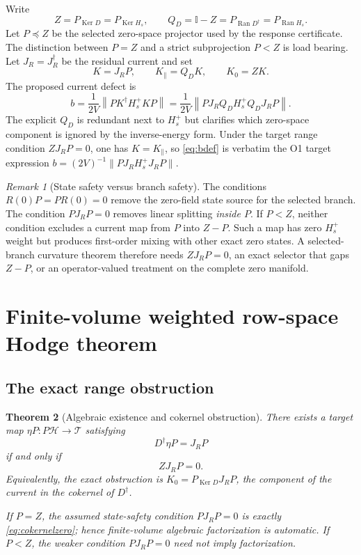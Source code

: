 \documentclass[11pt]{article}
\newtheorem{theorem}{Theorem}[section]
\theoremstyle{definition}
\theoremstyle{remark}
\newtheorem{remark}[theorem]{Remark}
\newcommand{\Ran}{\operatorname{Ran}}
\newcommand{\Ker}{\operatorname{Ker}}
\newcommand{\Id}{\mathbb I}
\newcommand{\cH}{\mathcal H}
\newcommand{\cT}{\mathcal T}
\newcommand{\norm}[1]{\left\lVert #1\right\rVert}
\begin{document}
Write
\begin{equation}
 Z=P_{\Ker D}=P_{\Ker H_s},
 \qquad
 Q_D=\Id-Z=P_{\Ran D^\dagger}=P_{\Ran H_s}.
 \label{eq:ZD}
\end{equation}
Let $P\preceq Z$ be the selected zero-space projector used by the response certificate.  The distinction between $P=Z$ and a strict subprojection $P<Z$ is load bearing.  Let $J_R=J_R^\dagger$ be the residual current and set
\begin{equation}
 K=J_RP,
 \qquad
 K_\parallel=Q_DK,
 \qquad
 K_0=ZK.
 \label{eq:Ksplit}
\end{equation}
The proposed current defect is
\begin{equation}
 b=\frac1{2V}\norm{PK^\dagger H_s^+KP}
 =\frac1{2V}\norm{PJ_RQ_DH_s^+Q_DJ_RP}.
 \label{eq:bdef}
\end{equation}
The explicit $Q_D$ is redundant next to $H_s^+$ but clarifies which zero-space component is ignored by the inverse-energy form.  Under the target range condition $ZJ_RP=0$, one has $K=K_\parallel$, so \eqref{eq:bdef} is verbatim the O1 target expression $b=(2V)^{-1}\|PJ_RH_s^+J_RP\|$.

\begin{remark}[State safety versus branch safety]
The conditions $R(0)P=PR(0)=0$ remove the zero-field state source for the selected branch.  The condition $PJ_RP=0$ removes linear splitting \emph{inside $P$}.  If $P<Z$, neither condition excludes a current map from $P$ into $Z-P$.  Such a map has zero $H_s^+$ weight but produces first-order mixing with other exact zero states.  A selected-branch curvature theorem therefore needs $ZJ_RP=0$, an exact selector that gaps $Z-P$, or an operator-valued treatment on the complete zero manifold.
\end{remark}

\section{Finite-volume weighted row-space Hodge theorem}

\subsection{The exact range obstruction}

\begin{theorem}[Algebraic existence and cokernel obstruction]
\label{thm:existence}
There exists a target map $\eta P:P\cH\to\cT$ satisfying
\begin{equation}
 D^\dagger\eta P=J_RP
 \label{eq:factor}
\end{equation}
if and only if
\begin{equation}
 ZJ_RP=0.
 \label{eq:cokernelzero}
\end{equation}
Equivalently, the exact obstruction is $K_0=P_{\Ker D}J_RP$, the component of the current in the cokernel of $D^\dagger$.

If $P=Z$, the assumed state-safety condition $PJ_RP=0$ is exactly \eqref{eq:cokernelzero}; hence finite-volume algebraic factorization is automatic.  If $P<Z$, the weaker condition $PJ_RP=0$ need not imply factorization.
\end{theorem}
\end{document}

